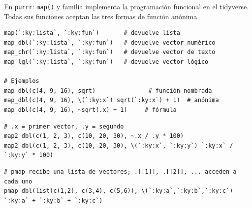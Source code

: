 \documentclass[8pt]{beamer}
\begin{document}
	\begin{frame}[fragile]{En \texttt{purrr}: \texttt{map()} y familia}
		 implementa la programación funcional en el tidyverse. Todas sus funciones aceptan las tres formas de función anónima.

\begin{lstlisting}[style=RScript]
map(`:ky:lista`, `:ky:fun`)       # devuelve lista
map_dbl(`:ky:lista`, `:ky:fun`)   # devuelve vector numérico
map_chr(`:ky:lista`, `:ky:fun`)   # devuelve vector de texto
map_lgl(`:ky:lista`, `:ky:fun`)   # devuelve vector lógico

# Ejemplos
map_dbl(c(4, 9, 16), sqrt)               # función nombrada
map_dbl(c(4, 9, 16), \(`:ky:x`) sqrt(`:ky:x`) + 1)  # anónima
map_dbl(c(4, 9, 16), ~sqrt(.x) + 1)     # fórmula
\end{lstlisting}

\begin{lstlisting}[style=RScript]
# .x = primer vector, .y = segundo
map2_dbl(c(1, 2, 3), c(10, 20, 30), ~.x / .y * 100)
map2_dbl(c(1, 2, 3), c(10, 20, 30), \(`:ky:x`, `:ky:y`) `:ky:x` / `:ky:y` * 100)
\end{lstlisting}

\begin{lstlisting}[style=RScript]
# pmap recibe una lista de vectores; .[[1]], .[[2]], ... acceden a cada uno
pmap_dbl(list(c(1,2), c(3,4), c(5,6)), \(`:ky:a`,`:ky:b`,`:ky:c`) `:ky:a` + `:ky:b` + `:ky:c`)
\end{lstlisting}
	\end{frame}
\end{document}
